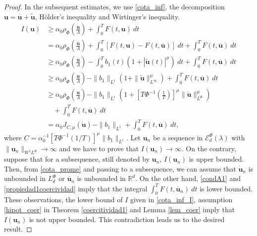 \documentclass[twoside]{elsarticle}
\theoremstyle{remark}
\newcommand{\orlnor}{\|_{L^{\Phi}}}
\newcommand{\lphi}{L^{\Phi}}
\newcommand{\sobnor}{\|_{W^{1}\lphi}}
\newcommand{\domi}{\mathcal{E}^{\Phi}_d(\lambda)}
\renewcommand{\b}[1]{\boldsymbol{#1}}
\begin{document}
\begin{proof} In the subsequent estimates, we use \eqref{cota_inf}, the decomposition $\b{u}=\b{\overline{u}}+\b{\tilde{u}}$, H\"older's inequality and Wirtinger's inequality. 
\begin{equation}\label{cota_inf_I}
\begin{split}
I(\b{u})&\geq\alpha_0\rho_{\Phi}\left( \frac{\b{\dot{u}}}{\Lambda}\right)+\int_0^TF(t,\b{u})\ dt\\ 
&=\alpha_0\rho_{\Phi}\left( \frac{\b{\dot{u}}}{\Lambda}\right)+ \int_0^T \left[F(t,\b{u})-F(t,\b{\overline{u}})\right]\ dt +  \int_0^TF(t,\b{\overline{u}})\ dt\\
&\geq\alpha_0\rho_{\Phi}\left( \frac{\b{\dot{u}}}{\Lambda}\right)- \int_0^Tb_1(t)(1+|\b{\tilde{u}}(t)|^{\mu})\ dt +  \int_0^TF(t,\b{\overline{u}})\ dt\\
&\geq \alpha_0\rho_{\Phi}\left( \frac{\b{\dot{u}}}{\Lambda}\right)- \|b_1\|_{L^1}(1+\|\b{\tilde{u}}\|_{L^{\infty}}^{\mu}) +  \int_0^TF(t,\b{\overline{u}})\ dt\\
&\geq\alpha_0\rho_{\Phi}\left( \frac{\b{\dot{u}}}{\Lambda}\right)- \|b_1\|_{L^1}\left(1+\left[T\Phi^{-1}\left(\frac{1}{T}\right)\right]^{\mu}\|\b{\dot u}\orlnor^{\mu}\right) \\
&\quad+  \int_0^TF(t,\b{\overline{u}})\ dt\\
&=\alpha_0J_{C,\mu}(\b{\dot{u}})- \|b_1\|_{L^1}+ \int_0^TF(t,\b{\overline{u}})\ dt,
\end{split}
\end{equation}
where $C=\alpha_0^{-1}\left[T\Phi^{-1}\left(1/T\right)\right]^{\mu}\|b_1\|_{L^1}$.
Let $\b{u}_n$ be  a sequence in $\domi$ with \linebreak 
$\|\b{u}_n\sobnor\to\infty$ and we have to prove that $I(\b{u}_n)\to\infty$. On the contrary, suppose  that for a subsequence, 
still denoted by $\b{u}_n$, $I(\b{u}_n)$ is upper bounded. Then, from \eqref{cota_prome} and passing to a subsequence, we can assume that $\b{\dot{u}}_n$ is unbounded in $\lphi_d$ or $\b{\overline{u}}_n$ is unbounded in $\mathbb{R}^d$.
On the other hand,  \eqref{condA1} and \eqref{propiedad1coercividad}
imply that the integral $\int_0^TF(t,\b{\overline{u}}_n)\ dt$ is lower bounded. 
These observations, the lower bound of $I$ given in \eqref{cota_inf_I}, 
assumption \ref{hipot_coer} in Theorem \ref{coercitividad1} and Lemma \ref{lem_coer} imply that $I(\b{u}_n)$ is not upper bounded. This contradiction leads us to the desired result.
\end{proof}
\end{document}
